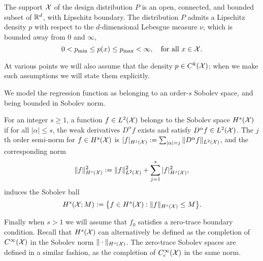 \begin{definition}
	\label{def:model_flat_euclidean}
	 The support $\mathcal{X}$ of the design distribution $P$ is an open, connected, and bounded subset of $\mathbb{R}^d$, with Lipschitz boundary. The distribution $P$ admits a Lipschitz density $p$ with respect to the $d$-dimensional Lebesgue measure $\nu$, which is bounded away from $0$ and $\infty$,
	\begin{equation*}
	0 < p_{\min} \leq p(x) \leq p_{\max} < \infty, \quad \textrm{for all $x \in \mathcal{X}$.}
	\end{equation*}
\end{definition}
At various points we will also assume that the density $p \in C^k(\mathcal{X})$; when we make such assumptions we will state them explicitly.

We model the regression function as belonging to an order-$s$ Sobolev space, and being bounded in Sobolev norm.
\begin{definition}
	\label{def:sobolev_space}
	For an integer $s \geq 1$, a function $f \in L^2(\mathcal{X})$ belongs to the Sobolev space $H^s(\mathcal{X})$ if for all $|\alpha| \leq s$, the weak derivatives $D^{\alpha}f$ exists and satisfy $D^{\alpha}f \in L^2(\mathcal{X})$. The $j$th order semi-norm for $f \in H^s(\mathcal{X})$ is $|f|_{H^j(\mathcal{X})} := \sum_{|\alpha| = j}\|D^{\alpha}f\|_{L^2(\mathcal{X})}$, and the corresponding norm
	\begin{equation*}
	\|f\|_{H^s(\mathcal{X})}^2 := \|f\|_{L^2(\mathcal{X})}^2 + \sum_{j = 1}^{s} |f|_{H^j(\mathcal{X})}^2,
	\end{equation*}
	induces the Sobolev ball
	\begin{equation*}
	H^s(\mathcal{X};M) := \bigl\{f \in H^s(\mathcal{X}): \|f\|_{H^s(\mathcal{X})} \leq M\bigr\}.
	\end{equation*} 
\end{definition}
Finally when $s > 1$ we will assume that $f_0$ satisfies a zero-trace boundary condition. Recall that $H^s(\mathcal{X})$ can alternatively be defined as the completion of $C^{\infty}(\mathcal{X})$ in the Sobolev norm $\|\cdot\|_{H^s(\mathcal{X})}$. The zero-trace Sobolev spaces are defined in a similar fashion, as the completion of $C_c^{\infty}(\mathcal{X})$ in the same norm.

